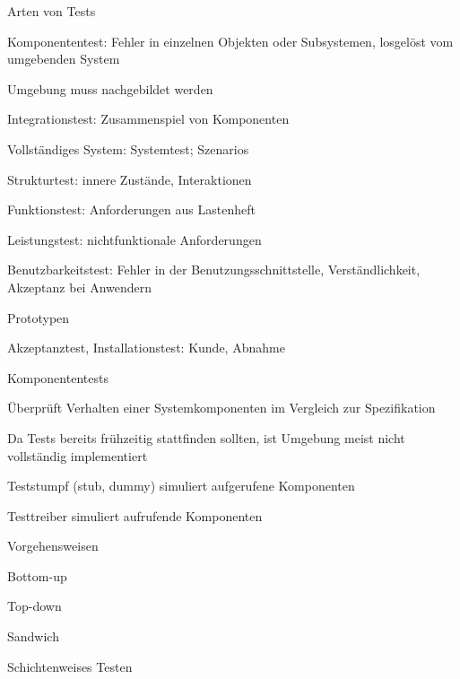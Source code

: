\documentclass[a4paper]{article}
\begin{document}
\begin{multicols}{3}
  Arten von Tests
  \begin{itemize*}
    \item Komponententest: Fehler in einzelnen Objekten oder Subsystemen, losgelöst vom umgebenden System
    \begin{itemize*}
      \item Umgebung muss nachgebildet werden
    \end{itemize*}
    \item Integrationstest: Zusammenspiel von Komponenten
    \begin{itemize*}
      \item Vollständiges System: Systemtest; Szenarios
    \end{itemize*}
    \item Strukturtest: innere Zustände, Interaktionen
    \item Funktionstest: Anforderungen aus Lastenheft
    \item Leistungstest: nichtfunktionale Anforderungen
    \item Benutzbarkeitstest: Fehler in der Benutzungsschnittstelle, Verständlichkeit, Akzeptanz bei Anwendern
    \begin{itemize*}
      \item Prototypen
    \end{itemize*}
    \item Akzeptanztest, Installationstest: Kunde, Abnahme
  \end{itemize*}

  Komponententests
  \begin{itemize*}
    \item Überprüft Verhalten einer Systemkomponenten im Vergleich zur Spezifikation
    \item Da Tests bereits frühzeitig stattfinden sollten, ist Umgebung meist nicht vollständig implementiert
    \begin{itemize*}
      \item Teststumpf (stub, dummy) simuliert aufgerufene Komponenten
      \item Testtreiber simuliert aufrufende Komponenten
    \end{itemize*}
    \item Vorgehensweisen
    \begin{itemize*}
      \item Bottom-up
      \item Top-down
      \item Sandwich
      \item Schichtenweises Testen
    \end{itemize*}
  \end{itemize*}


\end{multicols}
\end{document}
